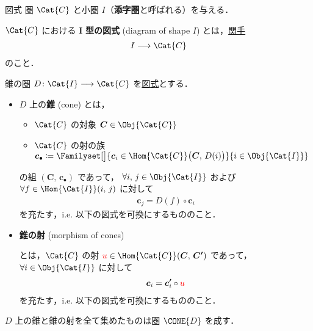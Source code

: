 \documentclass[TQFT_main]{subfiles}
\begin{document}
\begin{mydef}[label=def:diagram]{図式}
    圏 $\Cat{C}$ と小圏 $I$（\textbf{添字圏}と呼ばれる）を与える．
    
    $\Cat{C}$ における $\bm{I}$ \textbf{型の図式} (diagram of shape $I$) とは，\hyperref[def:functor]{関手}
    \begin{align}
        I \lto \Cat{C}
    \end{align}
    のこと．
\end{mydef}

\begin{mydef}[label=def:Cone, breakable]{錐の圏}
	$D \colon \Cat{I} \lto \Cat{C}$ を\hyperref[def:diagram]{図式}とする．
	\begin{itemize}
		\item $D$ 上の\textbf{錐} (cone) とは，
		\begin{itemize}
			\item $\Cat{C}$ の対象 $\bm{C} \in \Obj{\Cat{C}}$
			\item $\Cat{C}$ の射の族 $\bm{c}_\bullet \coloneqq \Familyset[\big]{\bm{c}_i \in \Hom{\Cat{C}}\bigl(\bm{C},\, D(i)\bigr)}{i \in \Obj{\Cat{I}}}$
		\end{itemize}
		の組 $(\bm{C},\, \bm{c}_\bullet)$ であって，
		$\forall i,\, j \in \Obj{\Cat{I}}$ および $\forall f \in \Hom{\Cat{I}}(i,\, j)$ に対して
		\begin{align}
			\bm{c}_j = D(f) \circ  \bm{c}_i
		\end{align}
		を充たす，i.e. 以下の図式を可換にするもののこと．
		\begin{center}
		\end{center}
		\item \textbf{錐の射} (morphism of cones) 
		\begin{center}
		\end{center}
		とは，$\Cat{C}$ の射 $\textcolor{red}{u} \in \Hom{\Cat{C}} (\bm{C},\, \bm{C'})$ であって，$\forall i \in \Obj{\Cat{I}}$ に対して
		\begin{align}
			\bm{c}_i = \bm{c'}_i \circ \textcolor{red}{u}
		\end{align}
		を充たす，i.e. 以下の図式を可換にするもののこと．
		\begin{center}
		\end{center}
	\end{itemize}
	$D$ 上の錐と錐の射を全て集めたものは圏 $\CONE{D}$ を成す．
\end{mydef}
\end{document}
